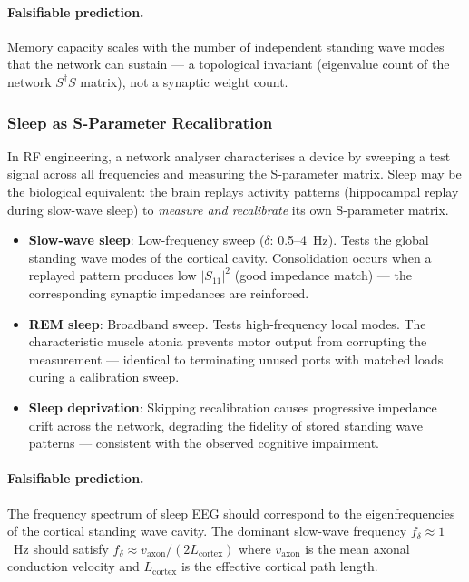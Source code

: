 \paragraph{Falsifiable prediction.}
Memory capacity scales with the number of independent
standing wave modes that the network can sustain --- a
topological invariant (eigenvalue count of the network
$S^\dagger S$ matrix), not a synaptic weight count.

\subsubsection{Sleep as S-Parameter Recalibration}
\label{sec:sleep_recalibration}

In RF engineering, a network analyser characterises a
device by sweeping a test signal across all frequencies
and measuring the S-parameter matrix.  Sleep may be the
biological equivalent: the brain replays activity
patterns (hippocampal replay during slow-wave sleep) to
\emph{measure and recalibrate} its own S-parameter matrix.

\begin{itemize}
    \item \textbf{Slow-wave sleep}: Low-frequency sweep
          ($\delta$: 0.5--4~Hz).  Tests the global
          standing wave modes of the cortical cavity.
          Consolidation occurs when a replayed pattern
          produces low $|S_{11}|^2$ (good impedance
          match) --- the corresponding synaptic
          impedances are reinforced.
    \item \textbf{REM sleep}: Broadband sweep.  Tests
          high-frequency local modes.  The characteristic
          muscle atonia prevents motor output from
          corrupting the measurement --- identical to
          terminating unused ports with matched loads
          during a calibration sweep.
    \item \textbf{Sleep deprivation}: Skipping
          recalibration causes progressive impedance
          drift across the network, degrading the
          fidelity of stored standing wave patterns ---
          consistent with the observed cognitive
          impairment.
\end{itemize}

\paragraph{Falsifiable prediction.}
The frequency spectrum of sleep EEG should correspond to
the eigenfrequencies of the cortical standing wave cavity.
The dominant slow-wave frequency $f_\delta \approx 1$~Hz
should satisfy $f_\delta \approx v_\text{axon} / (2L_\text{cortex})$
where $v_\text{axon}$ is the mean axonal conduction velocity
and $L_\text{cortex}$ is the effective cortical path length.

